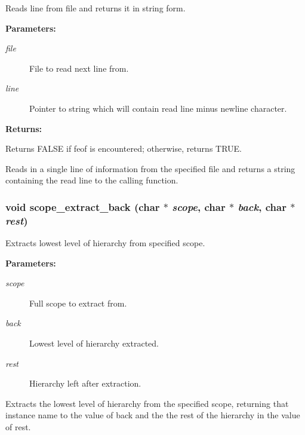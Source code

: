 Reads line from file and returns it in string form.

\begin{Desc}
\item[{\bf Parameters: }]\par
\begin{description}
\item[
{\em file}]File to read next line from. \item[
{\em line}]Pointer to string which will contain read line minus newline character.

\end{description}
\end{Desc}
\begin{Desc}
\item[{\bf Returns: }]\par
Returns FALSE if feof is encountered; otherwise, returns TRUE.

\end{Desc}
Reads in a single line of information from the specified file and returns a string containing the read line to the calling function. 
\subsubsection{\setlength{\rightskip}{0pt plus 5cm}void scope\_\-extract\_\-back (char $\ast$ {\em scope}, char $\ast$ {\em back}, char $\ast$ {\em rest})}\label{util_8c_a15}


Extracts lowest level of hierarchy from specified scope.

\begin{Desc}
\item[{\bf Parameters: }]\par
\begin{description}
\item[
{\em scope}]Full scope to extract from. \item[
{\em back}]Lowest level of hierarchy extracted. \item[
{\em rest}]Hierarchy left after extraction.

\end{description}
\end{Desc}
Extracts the lowest level of hierarchy from the specified scope, returning that instance name to the value of back and the the rest of the hierarchy in the value of rest. 
